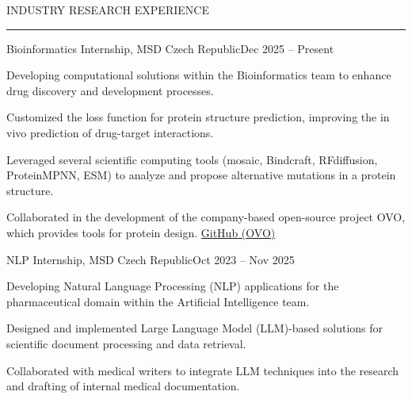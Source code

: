\documentclass{resume} %
\renewenvironment{rSection}[1]{
\sectionskip
\textcolor{CarnegieMellonRed}{\MakeUppercase{#1}}
\sectionlineskip
\hrule
\begin{list}{}{
\setlength{\leftmargin}{1.5em}
}
\item[]
}{
\end{list}
}
\begin{document}

\begin{rSection}{Industry Research Experience}

\begin{rProject}{\large Bioinformatics Internship, MSD Czech Republic}{Dec 2025 -- Present}{}{}
    \item Developing computational solutions within the Bioinformatics team to enhance drug discovery and development processes.
    \item Customized the loss function for protein structure prediction, improving the in vivo prediction of drug-target interactions.
    \item Leveraged several scientific computing tools (mosaic, Bindcraft, RFdiffusion, ProteinMPNN, ESM) to analyze and propose alternative mutations in a protein structure.
    \item Collaborated in the development of the company-based open-source project OVO, which provides tools for protein design. \href{https://github.com/MSDLLCpapers/ovo}{GitHub (OVO)}
\end{rProject}

\begin{rProject}{\large NLP Internship, MSD Czech Republic}{Oct 2023 -- Nov 2025}{}{}
    \item Developing Natural Language Processing (NLP) applications for the pharmaceutical domain within the Artificial Intelligence team.
    \item Designed and implemented Large Language Model (LLM)-based solutions for scientific document processing and data retrieval.
    \item Collaborated with medical writers to integrate LLM techniques into the research and drafting of internal medical documentation.
\end{rProject}

\end{rSection}
\end{document}
